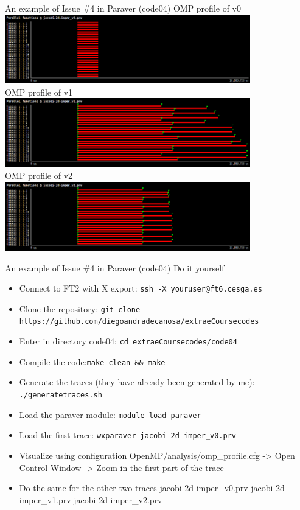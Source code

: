 \documentclass[10pt,xcolor=table]{beamer}
\begin{document}
\begin{frame}{An example of Issue \#4 in Paraver (code04)}
\centering
OMP profile of v0\\
\includegraphics[width=0.8\textwidth]{figs/Parallel_functions@jacobi-2d-imper_v0.png}\\
OMP profile of v1\\
\includegraphics[width=0.8\textwidth]{figs/Parallel_functions@jacobi-2d-imper_v1.png}\\
OMP profile of v2\\
\includegraphics[width=0.8\textwidth]{figs/Parallel_functions@jacobi-2d-imper_v2.png}\\
\end{frame}

\begin{frame}{An example of Issue \#4 in Paraver (code04)}
Do it yourself
\begin{itemize}
    \item Connect to FT2 with X export: {\tt ssh -X youruser@ft6.cesga.es}
    \item Clone the repository: {\tt git clone https://github.com/diegoandradecanosa/extraeCoursecodes}
    \item Enter in directory code04: {\tt cd extraeCoursecodes/code04}
        \item Compile the code:{\tt make clean && make}
    \item Generate the traces (they have already been generated by me): {\tt ./generatetraces.sh}
    \item Load the paraver module:  {\tt module load paraver}
    \item Load the first trace: {\tt wxparaver jacobi-2d-imper\_v0.prv}
    \item Visualize using configuration OpenMP/analysis/omp\_profile.cfg -> Open Control Window -> Zoom in the first part of the trace
    \item Do the same for the other two traces jacobi-2d-imper\_v0.prv jacobi-2d-imper\_v1.prv jacobi-2d-imper\_v2.prv
\end{itemize}
\end{frame}
\end{document}
